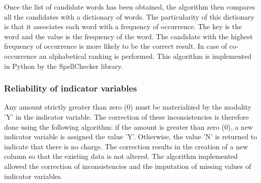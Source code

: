 Once the list of candidate words has been obtained, the algorithm then compares all the candidates with a dictionary of words. The particularity of this dictionary is that it associates each word with a frequency of occurrence. The key is the word and the value is the frequency of the word. The candidate with the highest frequency of occurrence is more likely to be the correct result. In case of co-occurrence an alphabetical ranking is performed. This algorithm is implemented in Python by the SpellChecker library. 

\subsubsection{Reliability of indicator variables}
Any amount strictly greater than zero (0) must be materialized by the modality 'Y' in the indicator variable. The correction of these inconsistencies is therefore done using the following algorithm: if the amount is greater than zero (0), a new indicator variable is assigned the value 'Y'. Otherwise, the value 'N' is returned to indicate that there is no charge. The correction results in the creation of a new column so that the existing data is not altered. The algorithm implemented allowed the correction of inconsistencies and the imputation of missing values of indicator variables.